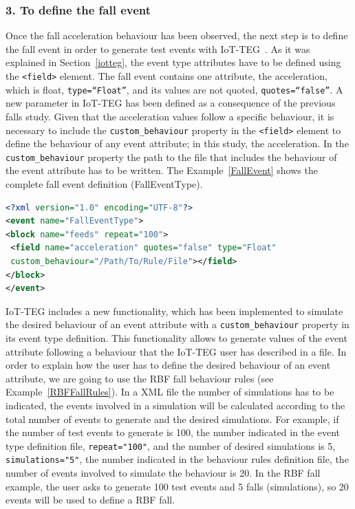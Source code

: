 \documentclass[review]{elsarticle}
\begin{document}
\subsubsection*{3. To define the fall event} Once the fall acceleration behaviour has been observed, the next step is to define the 
fall event in order to generate test events with IoT-TEG~\cite{TesisGutierrez2017,Gutierrez2017}. As it was explained in 
Section~\ref{iotteg}, the event type attributes have
to be defined using the \texttt{<field>} element. The fall event contains one attribute, the acceleration, which is float, 
\texttt{type=``Float''}, and its values are not quoted, \texttt{quotes=``false''}. A new parameter in IoT-TEG has been defined as a 
consequence of the previous falls study. Given that the acceleration values follow a specific behaviour, it is necessary to include 
the \texttt{custom\_behaviour} property in the \texttt{<field>} element to define the behaviour of any event attribute; 
in this study, the acceleration. In the \texttt{custom\_behaviour} property the path to the file that includes the behaviour of the 
event attribute has to be written. The Example~\ref{FallEvent} shows the complete fall event definition (FallEventType).

\begin{lstlisting}[basicstyle=\ttfamily\footnotesize,language=XML,caption={Fall event type definition},label=FallEvent]
<?xml version="1.0" encoding="UTF-8"?>
<event name="FallEventType">
<block name="feeds" repeat="100">
 <field name="acceleration" quotes="false" type="Float" 
 custom_behaviour="/Path/To/Rule/File"></field>
</block>
</event>
\end{lstlisting}

IoT-TEG includes a new functionality, which has been implemented to simulate the desired behaviour of an 
event attribute with a \texttt{custom\_behaviour} property in its event type definition. This functionality 
allows to generate values of the event attribute following a behaviour
that the IoT-TEG user has described in a file.
In order to explain how the user has to define the desired behaviour of an event attribute, we are going
to use the RBF fall behaviour rules (see Example~\ref{RBFFallRules}). In a XML file the number of simulations has to be
indicated, the events involved in a simulation will be calculated according to the total number of events
to generate and the desired simulations. For example, if the number of test events to generate is 100, 
the number indicated in the event type definition file, \texttt{repeat="100"}, and the number of desired 
simulations is 5, \texttt{simulations="5"}, the number indicated in the behaviour rules definition file, 
the number of events involved to simulate the behaviour is 20. In the RBF fall example, the user asks to 
generate 100 test events and 5 falls (simulations), so 20 events will be used to define a RBF fall.
\end{document}
